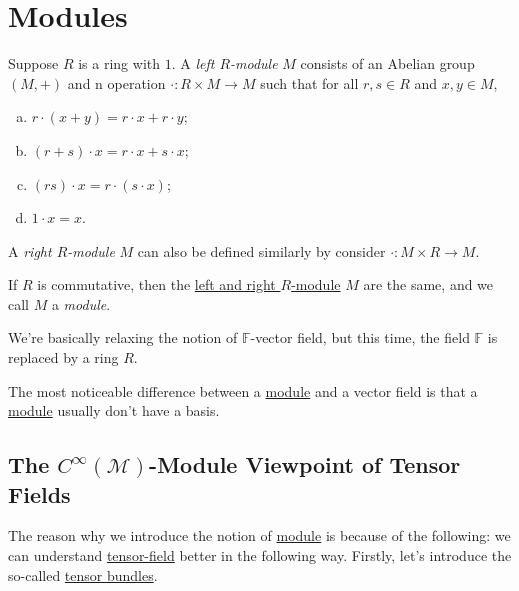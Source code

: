 \section{Modules}
\begin{definition}\label{def:left-module}
	Suppose \(R\) is a ring with \(1\). A \emph{left \(R\)-module} \(M\) consists of an Abelian group \((M, +)\) and n operation \(\cdot \colon R \times M \to M\) such that for all \(r, s\in R\) and \(x, y\in M\),
	\begin{enumerate}[(a)]
		\item \(r\cdot (x+y) = r\cdot x + r\cdot y\);
		\item \((r+s)\cdot x = r\cdot x + s\cdot x\);
		\item \((rs)\cdot x = r\cdot (s\cdot x)\);
		\item \(1\cdot x = x\).
	\end{enumerate}
\end{definition}

\begin{note}
	A \emph{right \(R\)-module} \(M\) can also be defined similarly by consider \(\cdot \colon M \times R \to M\).
\end{note}

\begin{definition}[Module]\label{def:module}
	If \(R\) is commutative, then the \hyperref[def:left-module]{left and right \(R\)-module} \(M\) are the same, and we call \(M\) a \emph{module}.
\end{definition}

\begin{intuition}
	We're basically relaxing the notion of \(\mathbb{F} \)-vector field, but this time, the field \(\mathbb{F} \) is replaced by a ring \(R\).
\end{intuition}

\begin{remark}
	The most noticeable difference between a \hyperref[def:module]{module} and a vector field is that a \hyperref[def:module]{module} usually don't have a basis.
\end{remark}

\subsection{The \(C^{\infty} (\mathcal{M} )\)-Module Viewpoint of Tensor Fields}\label{subsection:C-infty-module-viewpoint-of-tensor-fields}
The reason why we introduce the notion of \hyperref[def:module]{module} is because of the following: we can understand \hyperref[def:tensor-field*]{tensor-field} better in the following way. Firstly, let's introduce the so-called \hyperref[def:tensor-bundle]{tensor bundles}.

